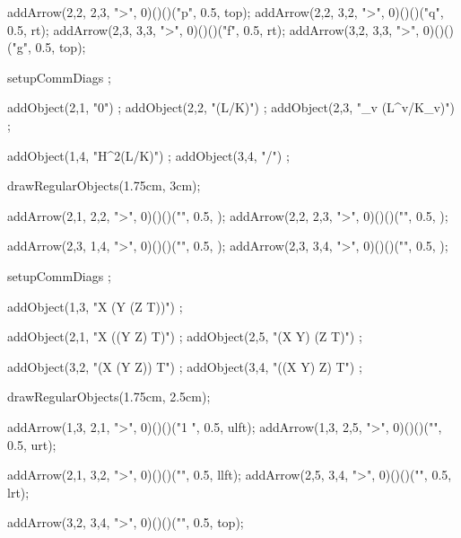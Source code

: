   addArrow(2,2, 2,3, ">", 0)()()("p", 0.5, top);
  addArrow(2,2, 3,2, ">", 0)()()("q", 0.5, rt);
  addArrow(2,3, 3,3, ">", 0)()()("f", 0.5, rt);
  addArrow(3,2, 3,3, ">", 0)()()("g", 0.5, top);
\stopMPcode\stopformula
\stopbuffer

\processTEXbuffer[cdBuf]

\typebuffer[cdBuf]

\blank[2*big]

\startbuffer[cdBuf]
\startformula{}
  setupCommDiags ;

  addObject(2,1, "0") ;
  addObject(2,2, "(L/K)") ;
  addObject(2,3, "\bigoplus_v (L^v/K_v)") ;

  addObject(1,4, "H^2(L/K)") ;
  addObject(3,4, "/") ;

  drawRegularObjects(1.75cm, 3cm);

  addArrow(2,1, 2,2, ">", 0)()()("", 0.5, );
  addArrow(2,2, 2,3, ">", 0)()()("", 0.5, );

  addArrow(2,3, 1,4, ">", 0)()()("", 0.5, );
  addArrow(2,3, 3,4, ">", 0)()()("", 0.5, );
\stopMPcode\stopformula
\stopbuffer

\processTEXbuffer[cdBuf]

\typebuffer[cdBuf]

\blank[2*big]

\startbuffer[cdBuf]
\startformula{}
  setupCommDiags ;

  addObject(1,3, "X \otimes (Y \otimes (Z \otimes T))") ;

  addObject(2,1, "X \otimes ((Y \otimes Z) \otimes T)") ;
  addObject(2,5, "(X \otimes Y) \otimes (Z \otimes T)") ;

  addObject(3,2, "(X \otimes (Y \otimes Z)) \otimes T") ;
  addObject(3,4, "((X \otimes Y) \otimes Z) \otimes T") ;

  drawRegularObjects(1.75cm, 2.5cm);

  addArrow(1,3, 2,1, ">", 0)()()("1 \otimes \phi", 0.5, ulft);
  addArrow(1,3, 2,5, ">", 0)()()("\phi", 0.5, urt);

  addArrow(2,1, 3,2, ">", 0)()()("\phi", 0.5, llft);
  addArrow(2,5, 3,4, ">", 0)()()("\phi", 0.5, lrt);

  addArrow(3,2, 3,4, ">", 0)()()("\phi {}", 0.5, top);
\stopMPcode\stopformula
\stopbuffer

\processTEXbuffer[cdBuf]

\typebuffer[cdBuf]

\blank[2*big]

